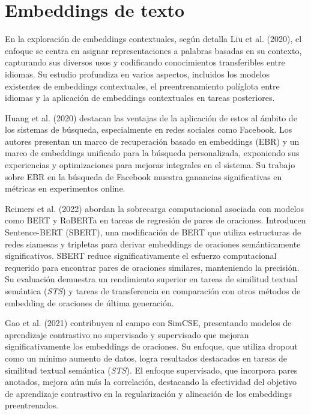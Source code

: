 \section{Embeddings de texto}
    En la exploración de embeddings contextuales, según detalla Liu et al. (2020)\cite{liu2020survey}, el enfoque se centra en asignar representaciones a palabras basadas en su contexto, capturando sus diversos usos y codificando conocimientos transferibles entre idiomas. Su estudio profundiza en varios aspectos, incluidos los modelos existentes de embeddings contextuales, el preentrenamiento políglota entre idiomas y la aplicación de embeddings contextuales en tareas posteriores.

    Huang et al. (2020)\cite{Huang_2020} destacan las ventajas de la aplicación de estos al ámbito de los sistemas de búsqueda, especialmente en redes sociales como Facebook. Los autores presentan un marco de recuperación basado en embeddings (EBR) y un marco de embeddings unificado para la búsqueda personalizada, exponiendo sus experiencias y optimizaciones para mejoras integrales en el sistema. Su trabajo sobre EBR en la búsqueda de Facebook muestra ganancias significativas en métricas en experimentos online.

    Reimers et al. (2022)\cite{reimers2019sentencebert} abordan la sobrecarga computacional asociada con modelos como BERT y RoBERTa en tareas de regresión de pares de oraciones. Introducen Sentence-BERT (SBERT), una modificación de BERT que utiliza estructuras de redes siamesas y tripletas para derivar embeddings de oraciones semánticamente significativos. SBERT reduce significativamente el esfuerzo computacional requerido para encontrar pares de oraciones similares, manteniendo la precisión. Su evaluación demuestra un rendimiento superior en tareas de similitud textual semántica (\emph{STS}) y tareas de transferencia en comparación con otros métodos de embedding de oraciones de última generación.

    Gao et al. (2021)\cite{gao2022simcse} contribuyen al campo con SimCSE, presentando modelos de aprendizaje contrastivo no supervisado y supervisado que mejoran significativamente los embeddings de oraciones. Su enfoque, que utiliza dropout como un mínimo aumento de datos, logra resultados destacados en tareas de similitud textual semántica (\emph{STS}). El enfoque supervisado, que incorpora pares anotados, mejora aún más la correlación, destacando la efectividad del objetivo de aprendizaje contrastivo en la regularización y alineación de los embeddings preentrenados.

